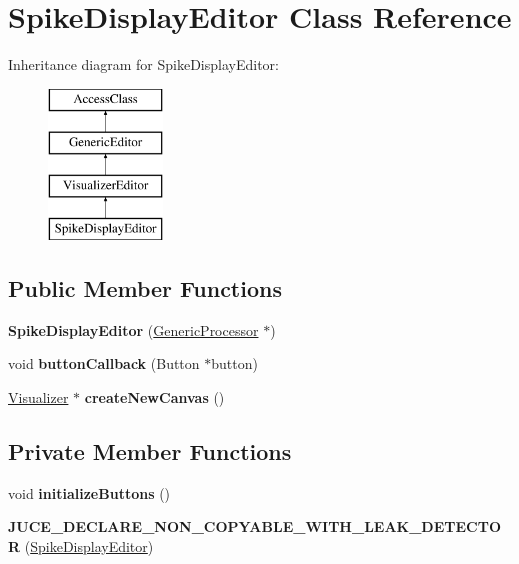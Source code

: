 \hypertarget{classSpikeDisplayEditor}{\section{Spike\-Display\-Editor Class Reference}
\label{classSpikeDisplayEditor}
}
Inheritance diagram for Spike\-Display\-Editor\-:\begin{figure}[H]
\begin{center}
\leavevmode
\includegraphics[height=4.000000cm]{classSpikeDisplayEditor}
\end{center}
\end{figure}
\subsection*{Public Member Functions}
\begin{DoxyCompactItemize}
\item 
\hypertarget{classSpikeDisplayEditor_ac983964da6dcf139ffaaa93473d8bc58}{{\bfseries Spike\-Display\-Editor} (\hyperlink{classGenericProcessor}{Generic\-Processor} $\ast$)}\label{classSpikeDisplayEditor_ac983964da6dcf139ffaaa93473d8bc58}

\item 
\hypertarget{classSpikeDisplayEditor_a5c622a46511053389820d631f2dcc88d}{void {\bfseries button\-Callback} (Button $\ast$button)}\label{classSpikeDisplayEditor_a5c622a46511053389820d631f2dcc88d}

\item 
\hypertarget{classSpikeDisplayEditor_a050a9b899e6028b6ec87b0b2a97d1a97}{\hyperlink{classVisualizer}{Visualizer} $\ast$ {\bfseries create\-New\-Canvas} ()}\label{classSpikeDisplayEditor_a050a9b899e6028b6ec87b0b2a97d1a97}

\end{DoxyCompactItemize}
\subsection*{Private Member Functions}
\begin{DoxyCompactItemize}
\item 
\hypertarget{classSpikeDisplayEditor_a2be7b29f480be05058f1c214a4458a0b}{void {\bfseries initialize\-Buttons} ()}\label{classSpikeDisplayEditor_a2be7b29f480be05058f1c214a4458a0b}

\item 
\hypertarget{classSpikeDisplayEditor_acfc32c99c09564b8885cb882638a677f}{{\bfseries J\-U\-C\-E\-\_\-\-D\-E\-C\-L\-A\-R\-E\-\_\-\-N\-O\-N\-\_\-\-C\-O\-P\-Y\-A\-B\-L\-E\-\_\-\-W\-I\-T\-H\-\_\-\-L\-E\-A\-K\-\_\-\-D\-E\-T\-E\-C\-T\-O\-R} (\hyperlink{classSpikeDisplayEditor}{Spike\-Display\-Editor})}\label{classSpikeDisplayEditor_acfc32c99c09564b8885cb882638a677f}

\end{DoxyCompactItemize}
